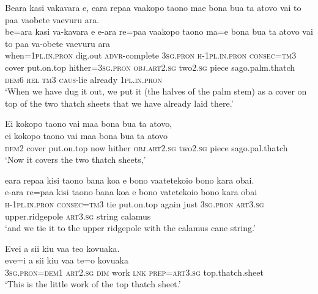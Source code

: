 \ea\label{ex:text13-9}
Beara kasi vakavara e, eara repaa vaakopo taono mae bona bua ta atovo vai to paa vaobete vaevuru ara.\\
\gll be=ara	kasi	va-kavara	e	e-ara	re=paa	vaakopo	taono	ma=e	bona	bua	ta	atovo	vai	to	paa	va-obete	vaevuru	ara\\
     when=1\textsc{pl}.\textsc{in}.\textsc{pron}	dig.out	\textsc{advr}-complete	3\textsc{sg}.\textsc{pron}	\textsc{h}-1\textsc{pl}.\textsc{in}.\textsc{pron}	\textsc{consec}=\textsc{tm}3	cover	put.on.top	hither=3\textsc{sg}.\textsc{pron}	\textsc{obj}.\textsc{art}2.\textsc{sg}	two2.\textsc{sg}	piece	sago.palm.thatch	\textsc{dem}6	\textsc{rel}	\textsc{tm}3	\textsc{caus}-lie	already	1\textsc{pl}.\textsc{in}.\textsc{pron}\\
\glt `When we have dug it out, we put it (the halves of the palm stem) as a cover on top of the two thatch sheets that we have already laid there.'
\z

\ea\label{ex:text13-10}
Ei kokopo taono vai maa bona bua ta atovo,\\
\gll ei	kokopo	taono	vai	maa	bona	bua	ta	atovo\\
     \textsc{dem}2	cover	put.on.top	now	hither	\textsc{obj}.\textsc{art}2.\textsc{sg}	two2.\textsc{sg}	piece	sago.pal.thatch\\
\glt `Now it covers the two thatch sheets,'
\z

\ea\label{ex:text13-11}
eara repaa kisi taono bana koa e bono vaatetekoio bono kara obai.\\
\gll e-ara	re=paa	kisi	taono	bana	koa	e	bono	vatetekoio	bono	kara	obai\\
     \textsc{h}-1\textsc{pl}.\textsc{in}.\textsc{pron}	\textsc{consec}=\textsc{tm}3	tie	put.on.top	again	just	3\textsc{sg}.\textsc{pron}	\textsc{art}3.\textsc{sg}	upper.ridgepole	\textsc{art}3.\textsc{sg}	string	calamus\\
\glt `and we tie it to the upper ridgepole with the calamus cane string.'
\z

\ea\label{ex:text13-12}
Evei a sii kiu vaa teo kovuaka.\\
\gll eve=i	a	sii	kiu	vaa	te=o	kovuaka\\
     3\textsc{sg}.\textsc{pron}=\textsc{dem}1	\textsc{art}2.\textsc{sg}	\textsc{dim}	work	\textsc{lnk}	\textsc{prep}=\textsc{art}3.\textsc{sg}	top.thatch.sheet\\
\glt `This is the little work of the top thatch sheet.'
\z
